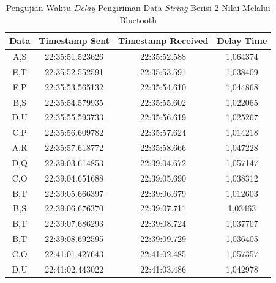 \begin{table}[htpb]
  \centering
  \caption{Pengujian Waktu \emph{Delay} Pengiriman Data \emph{String} Berisi 2 Nilai Melalui Bluetooth}
  \label{tbl:delayBluetooth}
  \begin{tabular}{|ccc|c|}
  \hline
  \multicolumn{1}{|c|}{Data} & \multicolumn{1}{c|}{Timestamp Sent}  & Timestamp Received & Delay Time  \\ \hline
  \multicolumn{1}{|c|}{A,S}  & \multicolumn{1}{c|}{22:35:51.523626} & 22:35:52.588       & 1,064374    \\ \hline
  \multicolumn{1}{|c|}{E,T}  & \multicolumn{1}{c|}{22:35:52.552591} & 22:35:53.591       & 1,038409    \\ \hline
  \multicolumn{1}{|c|}{E,P}  & \multicolumn{1}{c|}{22:35:53.565132} & 22:35:54.610       & 1,044868    \\ \hline
  \multicolumn{1}{|c|}{B,S}  & \multicolumn{1}{c|}{22:35:54.579935} & 22:35:55.602       & 1,022065    \\ \hline
  \multicolumn{1}{|c|}{D,U}  & \multicolumn{1}{c|}{22:35:55.593733} & 22:35:56.619       & 1,025267    \\ \hline
  \multicolumn{1}{|c|}{C,P}  & \multicolumn{1}{c|}{22:35:56.609782} & 22:35:57.624       & 1,014218    \\ \hline
  \multicolumn{1}{|c|}{A,R}  & \multicolumn{1}{c|}{22:35:57.618772} & 22:35:58.666       & 1,047228    \\ \hline
  \multicolumn{1}{|c|}{D,Q}  & \multicolumn{1}{c|}{22:39:03.614853} & 22:39:04.672       & 1,057147    \\ \hline
  \multicolumn{1}{|c|}{C,O}  & \multicolumn{1}{c|}{22:39:04.651688} & 22:39:05.690       & 1,038312    \\ \hline
  \multicolumn{1}{|c|}{B,T}  & \multicolumn{1}{c|}{22:39:05.666397} & 22:39:06.679       & 1,012603    \\ \hline
  \multicolumn{1}{|c|}{B,S}  & \multicolumn{1}{c|}{22:39:06.676370} & 22:39:07.711       & 1,03463     \\ \hline
  \multicolumn{1}{|c|}{B,T}  & \multicolumn{1}{c|}{22:39:07.686293} & 22:39:08.724       & 1,037707    \\ \hline
  \multicolumn{1}{|c|}{B,T}  & \multicolumn{1}{c|}{22:39:08.692595} & 22:39:09.729       & 1,036405    \\ \hline
  \multicolumn{1}{|c|}{C,O}  & \multicolumn{1}{c|}{22:41:01.427643} & 22:41:02.485       & 1,057357    \\ \hline
  \multicolumn{1}{|c|}{D,U}  & \multicolumn{1}{c|}{22:41:02.443022} & 22:41:03.486       & 1,042978    \\ \hline

\end{tabular}
\end{table}
